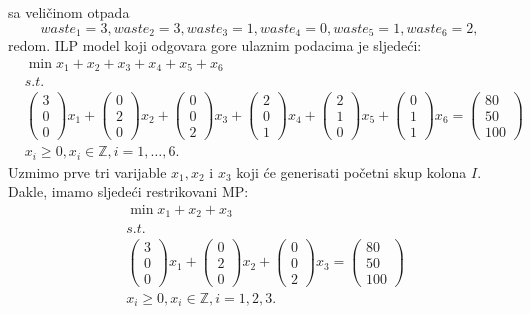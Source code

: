 \documentclass[a4paper, utf8, 11pt, colorlinks]{book}
\begin{document}
sa veličinom otpada 
$$ waste_1 = 3, waste_2 = 3, waste_3 = 1, waste_4 = 0, waste_5 = 1, waste_6 = 2,$$
redom. 
ILP model koji odgovara gore ulaznim podacima je sljedeći:
\begin{align*}
	 &\min x_1 + x_2 + x_3 + x_4 + x_5 + x_6 \\
	 &s.t. \\
	 &\begin{pmatrix}
	 	3 \\
	 	0 \\
	 	0  
	 \end{pmatrix} x_1 + \begin{pmatrix}
	 0 \\
	 2 \\
	 0  
 \end{pmatrix} x_2 +\begin{pmatrix}
 0 \\
 0 \\
 2  
\end{pmatrix} x_3 + 
 \begin{pmatrix}
	2 \\
	0 \\
	1  
\end{pmatrix} x_4 + 
 \begin{pmatrix}
	2 \\
	1 \\
	0  
\end{pmatrix} x_5 + 
\begin{pmatrix}
	0 \\
	1 \\
	1  
\end{pmatrix} x_6 = \begin{pmatrix}
      80 \\
      50 \\
      100
\end{pmatrix} \\
& x_i \geq 0, x_i \in \mathbb{Z}, i=1,\ldots,6.
\end{align*}
 Uzmimo prve tri varijable $x_1, x_2$ i $x_3$ koji će generisati početni skup kolona $I$.
 Dakle, imamo sljedeći restrikovani MP:
 \begin{align*}
 	 &\min x_1 + x_2 + x_3 \\
 	 & s.t. \\
 	 &\begin{pmatrix}
 	 	3 \\
 	 	0 \\
 	 	0  
 	 \end{pmatrix} x_1 + \begin{pmatrix}
 	 	0 \\
 	 	2 \\
 	 	0  
 	 \end{pmatrix} x_2 +\begin{pmatrix}
 	 	0 \\
 	 	0 \\
 	 	2  
 	 \end{pmatrix} x_3 = \begin{pmatrix}
  	     80 \\
  	     50 \\
  	     100
  \end{pmatrix} \\
  & x_i \geq 0, x_i \in \mathbb{Z}, i=1,2,3.
 \end{align*}  
\end{document}
